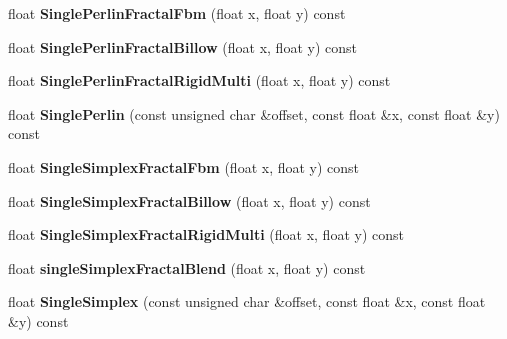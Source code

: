 \begin{DoxyCompactItemize}
\item 
\mbox{\label{class_flounder_1_1_noise_fast_a8b64295afcc8337d96db67b735f283dc}} 
float {\bfseries Single\+Perlin\+Fractal\+Fbm} (float x, float y) const
\item 
\mbox{\label{class_flounder_1_1_noise_fast_ae993ab633f10e2879dd5c4ff98a08b81}} 
float {\bfseries Single\+Perlin\+Fractal\+Billow} (float x, float y) const
\item 
\mbox{\label{class_flounder_1_1_noise_fast_aa3cf4d5a4bfc207b2d692670ca5076ea}} 
float {\bfseries Single\+Perlin\+Fractal\+Rigid\+Multi} (float x, float y) const
\item 
\mbox{\label{class_flounder_1_1_noise_fast_a31514058b99134eb49df05b7986d483e}} 
float {\bfseries Single\+Perlin} (const unsigned char \&offset, const float \&x, const float \&y) const
\item 
\mbox{\label{class_flounder_1_1_noise_fast_ac6e12db2124f9f579b033121ac0125b3}} 
float {\bfseries Single\+Simplex\+Fractal\+Fbm} (float x, float y) const
\item 
\mbox{\label{class_flounder_1_1_noise_fast_aa43d9859ece16a9b343823cd6578a4c5}} 
float {\bfseries Single\+Simplex\+Fractal\+Billow} (float x, float y) const
\item 
\mbox{\label{class_flounder_1_1_noise_fast_a965e7318f3321242621abaff00521cfb}} 
float {\bfseries Single\+Simplex\+Fractal\+Rigid\+Multi} (float x, float y) const
\item 
\mbox{\label{class_flounder_1_1_noise_fast_ae937b0d9d33b0ec396d48c94efc89a4f}} 
float {\bfseries single\+Simplex\+Fractal\+Blend} (float x, float y) const
\item 
\mbox{\label{class_flounder_1_1_noise_fast_a4cb87a5e3eb382448c1cd1caab2e4c52}} 
float {\bfseries Single\+Simplex} (const unsigned char \&offset, const float \&x, const float \&y) const
\item 

\end{DoxyCompactItemize}
